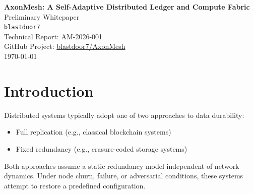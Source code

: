 \documentclass[11pt]{article}
\begin{document}
\begin{center}
{\LARGE \textbf{AxonMesh: A Self-Adaptive Distributed Ledger and Compute Fabric}} \\[1em]
{\Large Preliminary Whitepaper} \\[2em]

{\large \texttt{blastdoor7}} \\[1em]

Technical Report: AM-2026-001 \\ 
GitHub Project: \href{https://github.com/blastdoor7/AxonMesh}{blastdoor7/AxonMesh} \\[1em]
\today %
\end{center}

\begin{abstract}
We introduce AxonMesh, a distributed system architecture in which global state is not fully replicated across participating nodes, but instead fragmented and adaptively redistributed according to network conditions. In contrast to traditional blockchain systems and fixed-redundancy storage architectures, AxonMesh defines redundancy as a dynamic function of network size, health, and adversarial conditions.

The system exhibits a continuous transition between highly distributed (fragmented) and fully replicated states. Consensus is not achieved via deterministic agreement, but emerges from statistical properties of fragment distribution and reconstructability. AxonMesh further integrates distributed computation as a first-class primitive, enabling a unified substrate for storage, validation, and large-scale compute workloads.
\end{abstract}

\section{Introduction}

Distributed systems typically adopt one of two approaches to data durability:

\begin{itemize}
\item Full replication (e.g., classical blockchain systems)
\item Fixed redundancy (e.g., erasure-coded storage systems)
\end{itemize}

Both approaches assume a static redundancy model independent of network dynamics. Under node churn, failure, or adversarial conditions, these systems attempt to restore a predefined configuration.
\end{document}
